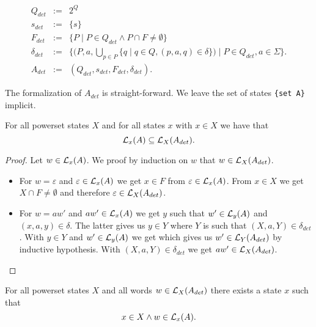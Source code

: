 \begin{eqnarray*}
    Q_{det} & := & 2^Q \\ %
    {s}_{det} & := & \{ s \} \\
    F_{det} & := & \{ P \; | \; P \in Q_{det} \wedge P \cap F \neq \emptyset \} \\
    \delta_{det} & := & \{ (P,a,\bigcup \limits _{p \in P} \{ q \; | \; q \in Q, (p,a,q) \in \delta \}) \; | \; P \in Q_{det}, a \in \Sigma \}.     \\
    A_{det} &:=&  (Q_{det}, s_{det}, F_{det}, \delta_{det}).
\end{eqnarray*}


The formalization of $A_{det}$ is straight-forward. 
We leave the set of states \lstinline_{set A}_ implicit.


\begin{lemma}
    \label{nfa_to_dfa_complete}
    For all powerset states $X$ and for all states $x$ with $x \in X$ we have that
    \begin{equation*}
        \mathcal{L}_{x}(A) \subseteq \mathcal{L}_{X}(A_{det}).
    \end{equation*}
\end{lemma}

\begin{proof}
    Let $w \in \mathcal{L}_{x}(A)$. We proof by induction on $w$ that $w \in \mathcal{L}_{X}(A_{det})$. 
    \begin{itemize}
        \item
            For $w = \varepsilon$ and $\varepsilon \in \mathcal{L}_{x}(A)$ we get $x \in F$ from $\varepsilon \in \mathcal{L}_{x}(A)$. 
            From $x \in X$ we get $X \cap F \neq \emptyset$ and therefore $\varepsilon \in \mathcal{L}_{X}(A_{det})$.
        \item
            For $w = a w'$ and $a w' \in \mathcal{L}_{x}(A)$ we get $y$ such that $w' \in \mathcal{L}_{y}(A)$ and $(x,a,y) \in \delta$.
            The latter gives us $y \in Y$ where $Y$ is such that $(X, a, Y) \in \delta_{det}$.
            With $y \in Y$ and $w' \in \mathcal{L}_{y}(A)$ we get 
            which gives us $w' \in \mathcal{L}_{Y}(A_{det})$ by inductive hypothesis.
            With $(X, a, Y) \in \delta_{det}$ we get $a w' \in \mathcal{L}_{X}(A_{det})$.
    \end{itemize}
\end{proof}


\begin{lemma}
    \label{nfa_to_dfa_sound}
    For all powerset states $X$ and all words $w \in \mathcal{L}_{X}(A_{det})$ there exists a state $x$ such that 
    \begin{equation*}
        x \in X \wedge
        w \in \mathcal{L}_{x}(A).
    \end{equation*}
\end{lemma}

